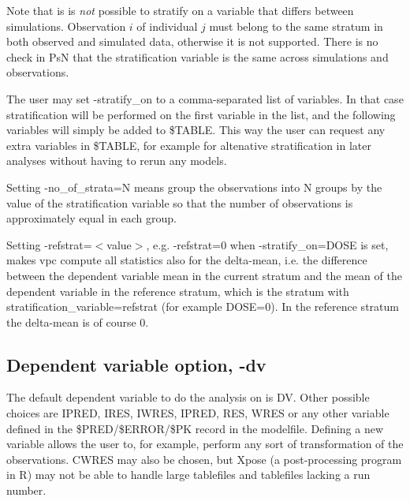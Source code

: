 Note that is is
\emph{not} possible to stratify on a variable that differs between simulations. Observation $i$ of individual $j$ must belong to the same stratum in both observed and simulated data, otherwise it is not supported. There is no check in PsN that the
stratification variable is the same across simulations and observations.

The user may set -stratify\_on to a comma-separated list of variables. In that case stratification will be performed on the first variable in the list, and the following variables will simply be added to \$TABLE. This way the user can request any extra variables in \$TABLE, for example for altenative stratification in later analyses without having to rerun any models.


Setting -no\_of\_strata=N means group the observations into N groups by the value of the stratification variable so that the number of observations is approximately equal in each group.

Setting -refstrat=$<$value$>$, e.g. -refstrat=0 when -stratify\_on=DOSE is set, makes vpc compute all statistics also for the delta-mean, i.e. the difference between the dependent variable mean in the current stratum and the mean of the dependent variable in the reference stratum, which is the stratum with stratification\_variable=refstrat (for example DOSE=0). In the reference stratum the delta-mean is of course 0.

\subsection{Dependent variable option, -dv}
The default dependent variable to do the analysis on is DV. Other possible choices are IPRED, IRES, IWRES, IPRED, RES, WRES or any other variable defined in the \$PRED/\$ERROR/\$PK record in the modelfile. Defining a new variable allows the user to, for example, perform any sort of transformation of the observations. CWRES may also be chosen, but Xpose (a post-processing program in R) may not be able to handle large tablefiles and tablefiles lacking a run number. 

